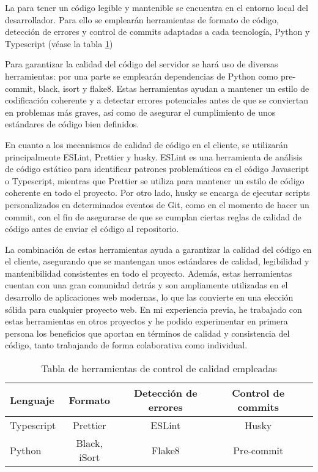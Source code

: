 La  para tener un código legible y mantenible se encuentra en el entorno local del desarrollador. Para ello se emplearán herramientas de formato de código, detección de errores y control de commits adaptadas a cada tecnología, Python y Typescript (véase la tabla \ref{tabla:comparativa})

Para garantizar la calidad del código del servidor se hará uso de diversas herramientas: por una parte se emplearán dependencias de Python como pre-commit, black, isort y flake8. Estas herramientas ayudan a mantener un estilo de codificación coherente y a detectar errores potenciales antes de que se conviertan en problemas más graves, así como de asegurar el cumplimiento de unos estándares de código bien definidos.

En cuanto a los mecanismos de calidad de código en el cliente, se utilizarán principalmente ESLint, Prettier y husky. ESLint es una herramienta de análisis de código estático para identificar patrones problemáticos en el código Javascript o Typescript, mientras que Prettier se utiliza para mantener un estilo de código coherente en todo el proyecto. Por otro lado, husky se encarga de ejecutar scripts personalizados en determinados eventos de Git, como en el momento de hacer un commit, con el fin de asegurarse de que se cumplan ciertas reglas de calidad de código antes de enviar el código al repositorio.

La combinación de estas herramientas ayuda a garantizar la calidad del código en el cliente, asegurando que se mantengan unos estándares de calidad, legibilidad y mantenibilidad consistentes en todo el proyecto. Además, estas herramientas cuentan con una gran comunidad detrás y son ampliamente utilizadas en el desarrollo de aplicaciones web modernas, lo que las convierte en una elección sólida para cualquier proyecto web. En mi experiencia previa, he trabajado con estas herramientas en otros proyectos y he podido experimentar en primera persona los beneficios que aportan en términos de calidad y consistencia del código, tanto trabajando de forma colaborativa como individual.

\begin{table}[h]
	\centering
	\begin{tabular}{|l|c|c|c|c|}
	\hline
	\textbf{Lenguaje} & \textbf{Formato} & \textbf{Detección de errores} & \textbf{Control de commits} \\ \hline
		Typescript         & Prettier & ESLint & Husky \\ \hline
		Python             & Black, iSort & Flake8 & Pre-commit \\ \hline
	\end{tabular}
    \caption{Tabla de herramientas de control de calidad empleadas}
    \label{tabla:comparativa}
\end{table}


